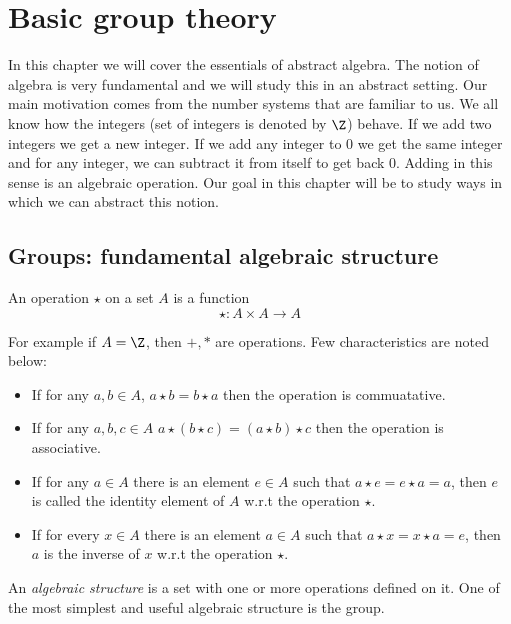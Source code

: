 \chapter{Basic group theory}
In this chapter we will cover the essentials of abstract algebra. The notion of algebra is very fundamental
and we will study this in an abstract setting. Our main motivation comes from the number systems that are
familiar to us. We all know how the integers (set of integers is denoted by $\Z$) behave. If we add two
integers we get a new integer. If we add any integer to $0$ we get the same integer and for any integer, we
can subtract it from itself to get back $0$. Adding in this sense is an algebraic operation. Our goal in this
chapter will be to study ways in which we can abstract this notion.
\section{Groups: fundamental algebraic structure}
\begin{Definition}
    An operation $\star$ on a set $A$ is a function
    \begin{equation*}
	\star : A \times A \to A
    \end{equation*}
\end{Definition}

For example if $A = \Z$, then $ + ,*$ are operations. Few characteristics are noted below:
\begin{itemize}
    \item If for any $a,b \in A$, $a \star b = b \star a$ then the operation is commuatative.
    \item If for any $a,b,c \in A$ $a \star \left(b \star c \right) = \left(a \star b \right) \star
	c $ then the operation is associative.
    \item If for any $a \in A$ there is an element $e \in A$ such that $a \star e = e \star a = a$,
	then $e$ is called the identity element of $A$ w.r.t the operation $\star$.
    \item If for every $x \in A$ there is an element $a \in A$ such that $ a \star x = x \star a =
	e$, then $a$ is the inverse of $x$ w.r.t the operation $\star$.
\end{itemize}

An \emph{algebraic structure} is a set with one or more operations defined on it. One of the most
simplest and useful algebraic structure is the group. 

